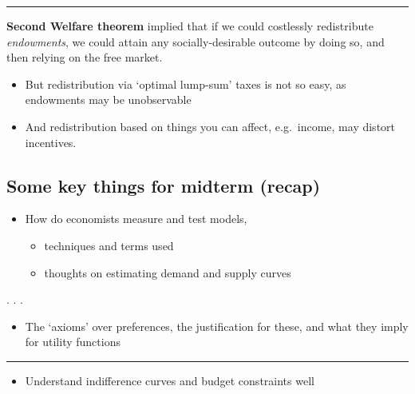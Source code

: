 \documentclass[]{article}
\providecommand{\tightlist}{%
  \setlength{\itemsep}{0pt}\setlength{\parskip}{0pt}}
\begin{document}
\begin{center}\rule{0.5\linewidth}{\linethickness}\end{center}

\textbf{Second Welfare theorem} implied that if we could costlessly
redistribute \emph{endowments}, we could attain any socially-desirable
outcome by doing so, and then relying on the free market.

\begin{itemize}
\item
  But redistribution via `optimal lump-sum' taxes is not so easy, as
  endowments may be unobservable
\item
  And redistribution based on things you can affect, e.g.~income, may
  distort incentives.
\end{itemize}

\hypertarget{some-key-things-for-midterm-recap}{%
\subsection{Some key things for midterm
(recap)}\label{some-key-things-for-midterm-recap}}

\begin{itemize}
\tightlist
\item
  How do economists measure and test models,

  \begin{itemize}
  \tightlist
  \item
    techniques and terms used
  \item
    thoughts on estimating demand and supply curves
  \end{itemize}
\end{itemize}

. . .

\bigskip

\bigskip

\begin{itemize}
\tightlist
\item
  The `axioms' over preferences, the justification for these, and what
  they imply for utility functions
\end{itemize}

\begin{center}\rule{0.5\linewidth}{\linethickness}\end{center}

\begin{itemize}
\tightlist
\item
  Understand indifference curves and budget constraints well
\end{itemize}
\end{document}
